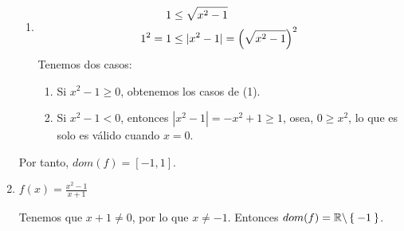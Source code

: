 \documentclass[11pt]{article}
\newcommand{\R}{\mathbb{R}}
\let\set\Set
\begin{document}
\begin{enumerate}[label=\roman*)]
\begin{enumerate}[label=\arabic*)]
  \item \begin{align*}
   1 &\leq \sqrt{x^2-1}\\
   1^2=1 &\leq |x^2-1|=\Bigl(\sqrt{x^2-1}\Bigr)^2
  \end{align*}Tenemos dos casos: \begin{enumerate}[label=\alph*)]
   \item Si $x^2-1\geq 0$, obtenemos los casos de (1). 
   \item Si $x^2-1<0$, entonces $|x^2-1|=-x^2+1 \geq 1$, osea, $0\geq x^2$, lo que es solo es válido cuando $x=0$.
  \end{enumerate}
 \end{enumerate}
 Por tanto, $dom(f)=[-1,1]$.

 \item $f(x)=\frac{x^2-1}{x+1}$
 
 Tenemos que $x+1\neq 0$, por lo que $x\neq -1$. Entonces $dom(f)=\R\backslash\set{-1}$.

\end{enumerate}
\end{document}
